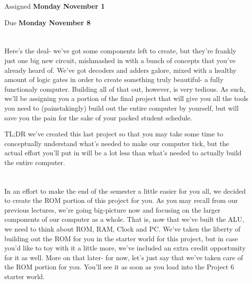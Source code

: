\documentclass{article}
\begin{document}
\large

{\selectfont{\Huge CMSC389E Project 4: \par Clock \& Program Counter}}

Assigned \textbf{Monday November 1}

Due \textbf{Monday November 8}

\section{\selectfont{Project At a Glance}}

Here's the deal- we've got some components left to create, but they're frankly just one big new circuit, mishmashed in with a bunch of concepts that you've already heard of.
We've got decoders and adders galore, mixed with a healthy amount of logic gates in order to create something truly beautiful- a fully functionaly computer.
Building all of that out, however, is very tedious.
As such, we'll be assigning you a portion of the final project that will give you all the tools you need to (painstakingly) build out the entire computer by yourself, but will save you the pain for the sake of your packed student schedule.

TL;DR we've created this last project so that you may take some time to conceptually understand what's needed to make our computer tick, but the actual effort you'll put in will be a lot less than what's needed to actually build the entire computer.

\section{\selectfont{Drake, where's the ROM?}}

In an effort to make the end of the semester a little easier for you all, we decided to create the ROM portion of this project for you. 
As you may recall from our previous lectures, we're going big-picture now and focusing on the larger components of our computer as a whole.
That is, now that we've built the ALU, we need to think about ROM, RAM, Clock and PC. 
We've taken the liberty of building out the ROM for you in the starter world for this project, but in case you'd like to toy with it a little more, we've included an extra credit opportunity for it as well.
More on that later- for now, let's just say that we've taken care of the ROM portion for you.
You'll see it as soon as you load into the Project 6 starter world.
\end{document}
